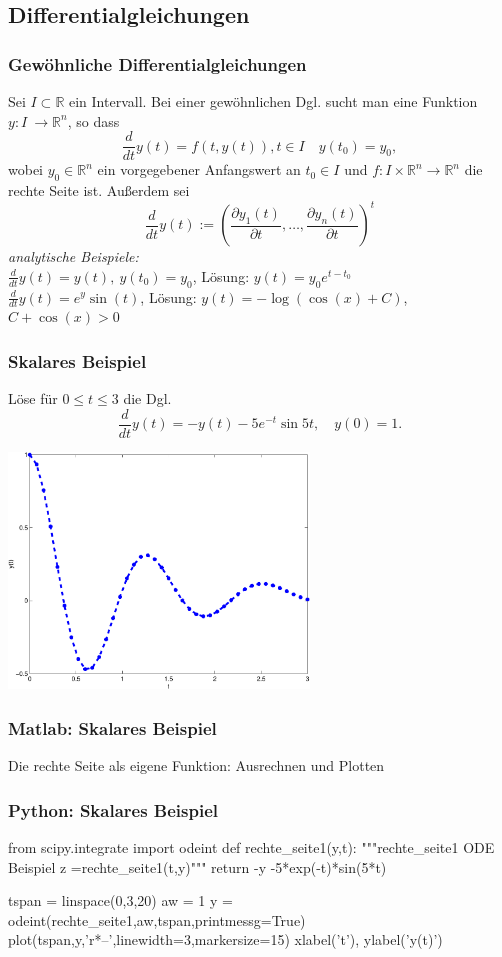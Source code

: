 \documentclass[hyperref={xetex}]{beamer}
\begin{document}
\subsection{Differentialgleichungen}
%
%
\begin{frame}[fragile]\frametitle{Gew\"ohnliche Differentialgleichungen}
Sei $I \subset \mathbb{R}$ ein Intervall. Bei einer gewöhnlichen Dgl. sucht man eine Funktion $y:I \
\longrightarrow \mathbb{R}^n$, so dass
\alert{ \[ \frac{d}{dt}y(t)=f(t,y(t)), t\in I\quad y(t_0)=y_0, \]}
wobei $y_0 \in \mathbb{R}^n$ ein vorgegebener Anfangswert an $t_0\in I$
und $f:I \times \mathbb{R}^n \longrightarrow \mathbb{R}^n$ die
rechte Seite ist. Au{\ss}erdem sei 
\[\frac{d}{dt}y(t) :=\left(\frac{\partial
  y_1(t)}{\partial t}, \dots, \frac{\partial
  y_n(t)}{\partial t}\right)^t\] 
\textsl{analytische Beispiele:}\\
$\frac{d}{dt} y(t) = y(t), \ y(t_0)=y_0$, \quad L\"osung:
$y(t)=y_0 e^{t-t_0}$\\
$\frac{d}{dt} y(t) = e^y \sin(t)$, \quad L\"osung: $y(t)=-\log( \cos(x)+C)$, $C+\cos(x)>0$
\end{frame}
%
%
\begin{frame}[fragile]\frametitle{Skalares Beispiel}
L\"ose f\"ur $0 \leq t \leq 3$ die Dgl.
\alert{ \[ \frac{d}{dt} y(t) = -y(t)-5e^{-t}\sin5t, \quad y(0)=1. \]}
\begin{center}
\includegraphics[width=0.6\textwidth]{./figures/loesung_dgl1} 
\end{center}
\end{frame}

%
%
\begin{frame}[fragile]\frametitle{Matlab: Skalares Beispiel}
Die rechte Seite als eigene Funktion:
Ausrechnen und Plotten
\end{frame}

%
%
\begin{frame}[fragile]\frametitle{Python: Skalares Beispiel}
  \begin{pyin}
from scipy.integrate import odeint
def rechte_seite1(y,t):
    """rechte_seite1   ODE Beispiel
       z  =rechte_seite1(t,y)"""
    return -y -5*exp(-t)*sin(5*t)

tspan =  linspace(0,3,20)
aw = 1
y = odeint(rechte_seite1,aw,tspan,printmessg=True)
plot(tspan,y,'r*--',linewidth=3,markersize=15)
xlabel('t'), ylabel('y(t)')    
  \end{pyin}
\end{frame}
\end{document}
